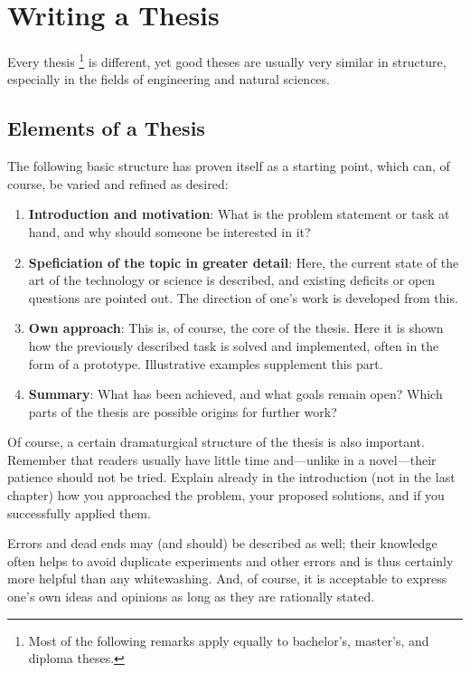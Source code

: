 \chapter{Writing a Thesis}
\label{cha:TheThesis}

Every thesis%
\footnote{Most of the following remarks apply equally to bachelor's, master's,
and diploma theses.}
is different, yet good theses are usually very similar in structure, especially
in the fields of engineering and natural sciences.

\section{Elements of a Thesis}

The following basic structure has proven itself as a starting point, which can,
of course, be varied and refined as desired:
%
\begin{enumerate}
	\item \textbf{Introduction and motivation}: What is the problem statement or
	task at hand, and why should someone be interested in it?
	\item \textbf{Speficiation of the topic in greater detail}: Here, the
	current state of the art of the technology or science is described, and
	existing deficits or open questions are pointed out. The direction of one's
	work is developed from this.
	\item \textbf{Own approach}: This is, of course, the core of the thesis.
	Here it is shown how the previously described task is solved and
	implemented, often in the form of a prototype. Illustrative examples
	supplement this part.
	\item \textbf{Summary}: What has been achieved, and what goals remain open?
	Which parts of the thesis are possible origins for further work?
\end{enumerate}
%
Of course, a certain dramaturgical structure of the thesis is also important.
Remember that readers usually have little time and---unlike in a novel---their
patience should not be tried. Explain already in the introduction (not in the
last chapter) how you approached the problem, your proposed solutions, and if
you successfully applied them.

Errors and dead ends may (and should) be described as well; their knowledge
often helps to avoid duplicate experiments and other errors and is thus
certainly more helpful than any whitewashing. And, of course, it is acceptable
to express one's own ideas and opinions as long as they are rationally stated.


